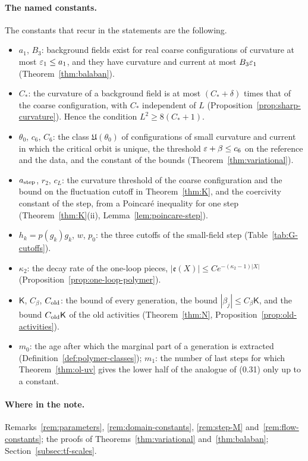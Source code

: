 \paragraph{The named constants.} The constants that recur in the statements are the following.
\begin{itemize}
\item $a_1$, $B_3$: background fields exist for real coarse configurations of curvature at most $\varepsilon_1\le a_1$, and they have curvature and current at most $B_3\varepsilon_1$ (Theorem~\ref{thm:balaban}).
\item $C_*$: the curvature of a background field is at most $(C_*+\delta)$ times that of the coarse configuration, with $C_*$ independent of $L$ (Proposition~\ref{prop:sharp-curvature}). Hence the condition $L^2\ge8(C_*+1)$.
\item $\theta_0$, $c_6$, $C_6$: the class $\mathfrak U(\theta_0)$ of configurations of small curvature and current in which the critical orbit is unique, the threshold $\varepsilon+\beta\le c_6$ on the reference and the data, and the constant of the bounds (Theorem~\ref{thm:variational}).
\item $a_{\rm step}$, $r_2$, $c_L$: the curvature threshold of the coarse configuration and the bound on the fluctuation cutoff in Theorem~\ref{thm:K}, and the coercivity constant of the step, from a Poincar\'e inequality for one step (Theorem~\ref{thm:K}(ii), Lemma~\ref{lem:poincare-step}).
\item $h_k=p(g_k)g_k$, $w$, $p_0$: the three cutoffs of the small-field step (Table~\ref{tab:G-cutoffs}).
\item $\kappa_2$: the decay rate of the one-loop pieces, $|\mathfrak e(X)|\le Ce^{-(\kappa_2-1)|X|}$ (Proposition~\ref{prop:one-loop-polymer}).
\item $\mathsf K$, $C_\beta$, $C_{\rm old}$: the bound of every generation, the bound $|\beta_j|\le C_\beta\mathsf K$, and the bound $C_{\rm old}\mathsf K$ of the old activities (Theorem~\ref{thm:N}, Proposition~\ref{prop:old-activities}).
\item $m_0$: the age after which the marginal part of a generation is extracted (Definition~\ref{def:polymer-classes}); $m_1$: the number of last steps for which Theorem~\ref{thm:ol-uv} gives the lower half of the analogue of (0.31) only up to a constant.
\end{itemize}

\paragraph{Where in the note.} Remarks~\ref{rem:parameters}, \ref{rem:domain-constants}, \ref{rem:step-M} and~\ref{rem:flow-constants}; the proofs of Theorems~\ref{thm:variational} and~\ref{thm:balaban}; Section~\ref{subsec:tf-scales}.

